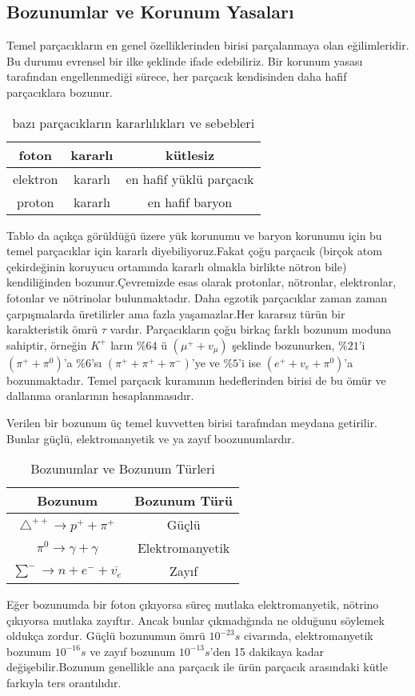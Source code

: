 \subsection{Bozunumlar ve Korunum Yasaları}
Temel parçacıkların en genel özelliklerinden birisi parçalanmaya olan eğilimleridir. Bu durumu evrensel bir ilke şeklinde ifade edebiliriz. Bir korunum yasası tarafından engellenmediği sürece, her parçacık kendisinden daha hafif parçacıklara bozunur.
\begin{table}[!htpb]

\centering
\begin{tabular}{|c|c|c|}
\hline 
foton & kararlı & kütlesiz \\ 
\hline 
elektron & kararlı & en hafif yüklü parçacık \\ 
\hline 
proton & kararlı & en hafif baryon \\ 
\hline 
\end{tabular}
\caption{bazı parçacıkların kararlılıkları ve sebebleri}
\end{table}
Tablo  da açıkça görüldüğü üzere yük korunumu ve baryon korunumu için bu temel parçacıklar için kararlı diyebiliyoruz.Fakat çoğu parçacık (birçok atom çekirdeğinin koruyucu ortamında kararlı olmakla birlikte nötron bile) kendiliğinden bozunur.Çevremizde esas olarak protonlar, nötronlar, elektronlar, fotonlar ve nötrinolar bulunmaktadır. Daha egzotik parçacıklar zaman zaman çarpışmalarda üretilirler ama fazla yaşamazlar.Her kararsız türün bir karakteristik ömrü $\tau$ vardır. Parçacıkların çoğu birkaç farklı bozunum moduna sahiptir, örneğin $K^+$ ların $\%64$ ü $(\mu^+ + v_\mu )$ şeklinde bozunurken, $\%21$'i $(\pi^+ + \pi^0)$'a $\%6$'sı $(\pi^+ + \pi^+ + \pi^- )$'ye ve $\%5$'i ise $(e^+ + v_e + \pi^0)$'a bozunmaktadır. Temel parçacık kuramının hedeflerinden birisi de bu ömür ve dallanma oranlarının hesaplanmasıdır. 
\par Verilen bir bozunum üç temel kuvvetten birisi tarafından meydana getirilir. Bunlar güçlü, elektromanyetik ve ya zayıf boozunumlardır.

\begin{table}[!htpb]
\centering
\begin{tabular}{|c|c|}
\hline 
Bozunum & Bozunum Türü \\ 
\hline 
$\triangle^{++} \rightarrow p^+ + \pi^+$ & Güçlü  \\ 
\hline 
$\pi^0 \rightarrow \gamma + \gamma$ & Elektromanyetik \\ 
\hline 
$\sum^- \rightarrow n + e^- + \overline{v_e} $ & Zayıf \\ 
\hline 
\end{tabular} 

\caption{Bozunumlar ve Bozunum Türleri}
\end{table}
Eğer bozunumda bir foton çıkıyorsa süreç mutlaka elektromanyetik, nötrino çıkıyorsa mutlaka zayıftır. Ancak bunlar çıkmadığında ne olduğunu söylemek oldukça zordur. Güçlü bozunumun ömrü $10^{-23}s$ civarında, elektromanyetik bozunum  $10^{-16}s$ ve zayıf bozunum $10^{-13}s$'den 15 dakikaya kadar değişebilir.Bozunum genellikle ana parçacık ile ürün parçacık arasındaki kütle farkıyla ters orantılıdır.  

